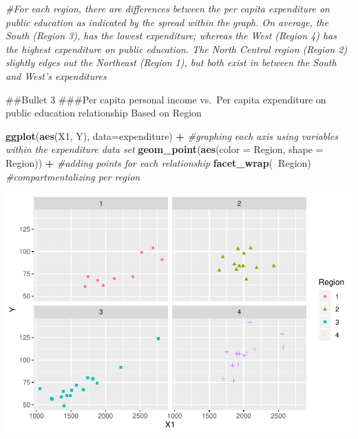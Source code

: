 \documentclass[]{article}
\newenvironment{Shaded}{\begin{snugshade}}{\end{snugshade}}
\newcommand{\CommentTok}[1]{\textcolor[rgb]{0.56,0.35,0.01}{\textit{#1}}}
\newcommand{\DataTypeTok}[1]{\textcolor[rgb]{0.13,0.29,0.53}{#1}}
\newcommand{\KeywordTok}[1]{\textcolor[rgb]{0.13,0.29,0.53}{\textbf{#1}}}
\newcommand{\NormalTok}[1]{#1}
\newcommand{\OperatorTok}[1]{\textcolor[rgb]{0.81,0.36,0.00}{\textbf{#1}}}
\newcommand{\StringTok}[1]{\textcolor[rgb]{0.31,0.60,0.02}{#1}}
\begin{document}
\begin{Shaded}
\begin{Highlighting}[]
\CommentTok{#For each region, there are differences between the per capita expenditure on public education as indicated by the spread within the graph. On average, the South (Region 3), has the lowest expenditure; whereas the West (Region 4) has the highest expenditure on public education. The North Central region (Region 2) slightly edges out the Northeast (Region 1), but both exist in between the South and West's expenditures}
\end{Highlighting}
\end{Shaded}

\#\#Bullet 3 \#\#\#Per capita personal income vs.~Per capita expenditure
on public education relationship Based on Region

\begin{Shaded}
\begin{Highlighting}[]
\KeywordTok{ggplot}\NormalTok{(}\KeywordTok{aes}\NormalTok{(X1, Y), }\DataTypeTok{data=}\NormalTok{expenditure) }\OperatorTok{+}\StringTok{ }\CommentTok{#graphing each axis using variables within the expenditure data set}
\StringTok{  }\KeywordTok{geom_point}\NormalTok{(}\KeywordTok{aes}\NormalTok{(}\DataTypeTok{color =}\NormalTok{ Region, }\DataTypeTok{shape =}\NormalTok{ Region)) }\OperatorTok{+}\StringTok{ }\CommentTok{#adding points for each relationship}
\StringTok{  }\KeywordTok{facet_wrap}\NormalTok{(}\OperatorTok{~}\NormalTok{Region) }\CommentTok{#compartmentalizing per region}
\end{Highlighting}
\end{Shaded}

\includegraphics{PS_answers_files/figure-latex/unnamed-chunk-10-1.pdf}
\end{document}
